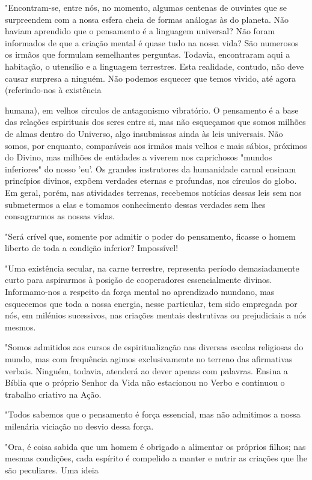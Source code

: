 \documentclass[portuguese,12pt,a4paper]{scrbook}
\begin{document}
	"Encontram-se, entre nós, no momento, algumas centenas de ouvintes que se surpreendem com a nossa esfera cheia de formas análogas às do planeta. Não haviam aprendido que o pensamento é a linguagem universal? Não foram informados de que a criação mental é quase tudo na nossa vida? São numerosos os irmãos que formulam semelhantes perguntas. Todavia, encontraram aqui a habitação, o utensílio e a linguagem terrestres. Esta realidade, contudo, não deve causar surpresa a ninguém. Não podemos esquecer que temos vivido, até agora (referindo-nos à existência
	
	
	humana), em velhos círculos de antagonismo vibratório. O pensamento é a base das relações espirituais dos seres entre si, mas não esqueçamos que somos milhões de almas dentro do Universo, algo insubmissas ainda às leis universais. Não somos, por enquanto, comparáveis aos irmãos mais velhos e mais sábios, próximos do Divino, mas milhões de entidades a viverem nos caprichosos "mundos inferiores" do nosso 'eu'. Os grandes instrutores da humanidade carnal ensinam princípios divinos, expõem verdades eternas e profundas, nos círculos do globo. Em geral, porém, nas atividades terrenas, recebemos notícias dessas leis sem nos submetermos a elas e tomamos conhecimento dessas verdades sem lhes consagrarmos as nossas vidas.
	
	"Será crível que, somente por admitir o poder do pensamento, ficasse o homem liberto de toda a condição inferior? Impossível!
	
	"Uma existência secular, na carne terrestre, representa período demasiadamente curto para aspirarmos à posição de cooperadores essencialmente divinos. Informamo-nos a respeito da força mental no aprendizado mundano, mas esquecemos que toda a nossa energia, nesse particular, tem sido empregada por nós, em milénios sucessivos, nas criações mentais destrutivas ou prejudiciais a nós mesmos.
	
	"Somos admitidos aos cursos de espiritualização nas diversas escolas religiosas do mundo, mas com frequência agimos exclusivamente no terreno das afirmativas verbais. Ninguém, todavia, atenderá ao dever apenas com palavras. Ensina a Bíblia que o próprio Senhor da Vida não estacionou no Verbo e continuou o trabalho criativo na Ação.
	
	"Todos sabemos que o pensamento é força essencial, mas não admitimos a nossa milenária viciação no desvio dessa força.
	
	"Ora, é coisa sabida que um homem é obrigado a alimentar os próprios filhos; nas mesmas condições, cada espírito é compelido a manter e nutrir as criações que lhe são peculiares. Uma ideia
	
\end{document}
